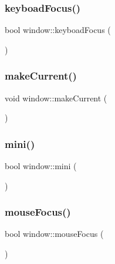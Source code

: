 \mbox{\label{classwindow_af1fea6fcd133b4dc5a9f8ce5badfa3c5}} 
\subsubsection{\texorpdfstring{keyboad\+Focus()}{keyboadFocus()}}
{\footnotesize\ttfamily bool window\+::keyboad\+Focus (\begin{DoxyParamCaption}{ }\end{DoxyParamCaption})}

\mbox{\label{classwindow_a0b20618eaa80cec156c41e65e5d92817}} 
\subsubsection{\texorpdfstring{make\+Current()}{makeCurrent()}}
{\footnotesize\ttfamily void window\+::make\+Current (\begin{DoxyParamCaption}{ }\end{DoxyParamCaption})}

\mbox{\label{classwindow_aaedffb8fcfdda61beda75a2f31651948}} 
\subsubsection{\texorpdfstring{mini()}{mini()}}
{\footnotesize\ttfamily bool window\+::mini (\begin{DoxyParamCaption}{ }\end{DoxyParamCaption})}

\mbox{\label{classwindow_a075faf88a621288e18a9c112628be059}} 
\subsubsection{\texorpdfstring{mouse\+Focus()}{mouseFocus()}}
{\footnotesize\ttfamily bool window\+::mouse\+Focus (\begin{DoxyParamCaption}{ }\end{DoxyParamCaption})}

